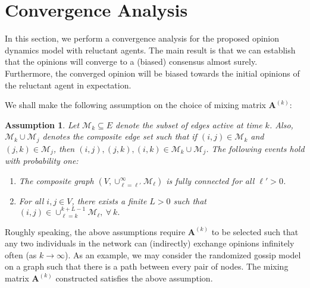 \documentclass[letter]{article}
\newtheorem{Assumption}{Assumption}
\theoremstyle{remark}
\begin{document}
%




\section{Convergence Analysis} 
In this section, we perform a convergence analysis for the proposed opinion dynamics model with reluctant agents. 
The main result is that we can establish that the opinions will  converge to a (biased) consensus almost surely. 
Furthermore, the converged opinion will be biased towards the initial opinions of the reluctant agent in expectation. 

We shall make the following assumption on the choice of mixing matrix ${\bm A}^{(k)}$:
\begin{Assumption}
Let $\mathcal{M}_k \subseteq E$ denote the subset of edges active at time $k$. Also, $\mathcal{M}_k \cup \mathcal{M}_{j}$ denotes the composite edge set such that if $(i,j) \in \mathcal{M}_k$ and $(j,k) \in \mathcal{M}_j$, then $(i,j),(j,k),(i,k) \in \mathcal{M}_k \cup \mathcal{M}_{j}$. The following events hold with probability one:
\begin{enumerate}
\item The composite graph $(V, \cup_{\ell = \ell'}^\infty \mathcal{M}_\ell)$ is fully connected for all $\ell' > 0$. 
\item For all $i,j \in V$, there exists a finite $L > 0$ such that $(i,j) \in \cup_{\ell = k}^{k+L-1} \mathcal{M}_\ell,~\forall~k.$
\end{enumerate}
\end{Assumption}
Roughly speaking, the above assumptions require ${\bm A}^{(k)}$ to be selected such that any two individuals in the network can (indirectly) exchange opinions infinitely often (as $k \rightarrow \infty$). 
As an example, we may consider the randomized gossip model on a graph such that there is a path between every pair of nodes. The mixing matrix ${\bm A}^{(k)}$ constructed  satisfies the above assumption.
\end{document}
